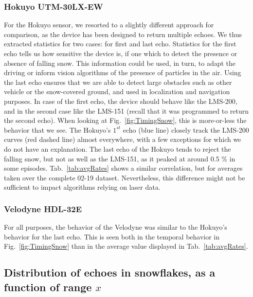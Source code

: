 \subsubsection{Hokuyo UTM-30LX-EW}
For the Hokuyo sensor, we resorted to a slightly different approach for comparison, as the device has been designed to return multiple echoes. We thus extracted statistics for two cases: for first and last echo. Statistics for the first echo tells us how sensitive the device is, if one which to detect the presence or absence of falling snow. This information could be used, in turn, to adapt the driving or inform vision algorithms of the presence of particles in the air. Using the last echo ensures that we are able to detect large obstacles such as other vehicle or the snow-covered ground, and used in localization and navigation purposes. In case of the first echo, the device should behave like the LMS-200, and in the second case like the LMS-151 (recall that it was programmed to return the second echo). When looking at Fig.~\ref{fig:TimingSnow}, this is more-or-less the behavior that we see. The Hokuyo's $1^{st}$ echo (blue line) closely track the LMS-200 curves (red dashed line) almost everywhere, with a few exceptions for which we do not have an explanation. The last echo of the Hokuyo tends to reject the falling snow, but not as well as the LMS-151, as it peaked at around 0.5 \% in some episodes. Tab.~\ref{tab:avgRates} shows a similar correlation, but for averages taken over the complete 02-19 dataset. Nevertheless, this difference might not be sufficient to impact algorithms relying on laser data.

\subsubsection{Velodyne HDL-32E}
For all purposes, the behavior of the Velodyne was similar to the Hokuyo's behavior for the last echo. This is seen both in the temporal behavior in Fig.~\ref{fig:TimingSnow} than in the average value displayed in Tab.~\ref{tab:avgRates}.

\subsection{Distribution of echoes in snowflakes, as a function of range $x$}
\label{subsub:Histo}

